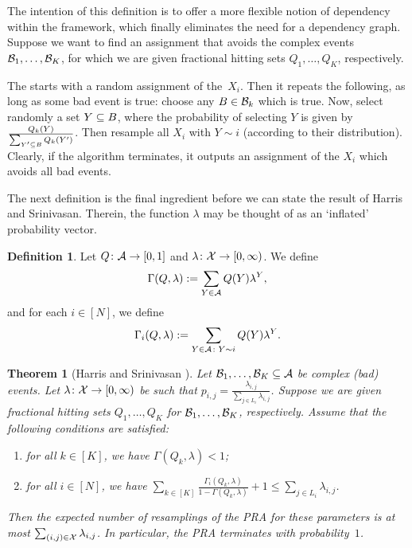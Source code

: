 \documentclass[10pt]{amsart}
\newtheorem{theorem}[algorithm]{Theorem}
\theoremstyle{definition}
\newtheorem{defin}[algorithm]{Definition}
\theoremstyle{claimstyle}
\theoremstyle{stepstyle}
\numberwithin{equation}{section}
\begin{document}
The intention of this definition is to offer a more flexible notion of dependency within the framework, which finally eliminates the need for a dependency graph.
Suppose we want to find an assignment that avoids the complex events $\mathcal{B}_1,\ldots,\mathcal{B}_K$, for which we are given fractional hitting sets $Q_1,\dots,Q_K$, respectively.

The  starts with a random assignment of the~$X_i$. Then it repeats the following, as long as some bad event is true: choose any $B\in \mathcal{B}_k$ which is true. Now, select randomly a set $Y\subseteq B$, where the probability of selecting $Y$ is given by $\frac{Q_k(Y)}{\sum_{Y'\subseteq B}Q_k(Y')}$. Then resample all $X_i$ with $Y\sim i$ (according to their distribution).
Clearly, if the algorithm terminates, it outputs an assignment of the $X_i$ which avoids all bad events.

The next definition is the final ingredient before we can state the result of Harris and Srinivasan.
Therein, the function $\lambda$ may be thought of as an `inflated' probability vector.

\begin{defin}
Let $Q\colon \mathcal{A}\to [0,1]$ and $\lambda\colon \mathcal{X} \to [0,\infty)$. We define
$$\Gamma(Q,\lambda):= \sum_{Y\in \mathcal{A}}Q(Y)\lambda^Y,$$ and for each $i\in [N]$, we define $$\Gamma_i(Q,\lambda):= \sum_{Y\in \mathcal{A} \colon Y\sim i} Q(Y)\lambda^Y.$$
\end{defin}


\begin{theorem}[Harris and Srinivasan {\cite[{Theorem~3.8, see also Equation~(10)}]{HS:18}}] \label{thm:PRA}
Let $\mathcal{B}_1,\dots,\mathcal{B}_K \subseteq \mathcal{A}$ be complex (bad) events.
Let $\lambda\colon \mathcal{X} \to [0,\infty)$ be such that $p_{i,j}=\frac{\lambda_{i,j}}{\sum_{j\in L_i}\lambda_{i,j}}$. Suppose we are given fractional hitting sets $Q_1,\dots,Q_K$ for $\mathcal{B}_1,\dots,\mathcal{B}_K$, respectively. Assume that the following conditions are satisfied:
\begin{enumerate}[label=\rm{(\roman*)}]
  \item for all $k\in [K]$, we have $\Gamma(Q_k,\lambda)<1$;
  \item for all $i\in [N]$, we have $\sum_{k\in [K]}\frac{\Gamma_i(Q_k,\lambda)}{1-\Gamma(Q_k,\lambda)} +1 \le \sum_{j\in L_i}\lambda_{i,j}$.
\end{enumerate}
Then the expected number of resamplings of the PRA for these parameters is at most $\sum_{(i,j)\in \mathcal{X}}\lambda_{i,j}$. In particular, the PRA terminates with probability~$1$.
\end{theorem}
\end{document}
